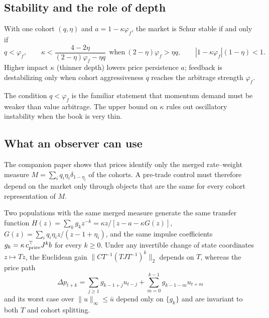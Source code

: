 \subsection{Stability and the role of depth}

\begin{proposition}\label{prop:jury}
With one cohort $(q,\eta)$ and $a=1-\kappa\varphi_f$, the market is Schur stable if and only if
\begin{equation}\label{eq:jury}
q<\varphi_f,\qquad \kappa<\frac{4-2\eta}{(2-\eta)\varphi_f-\eta q}\ \ \text{when}\ (2-\eta)\varphi_f>\eta q,\qquad |1-\kappa\varphi_f|(1-\eta)<1 .
\end{equation}
Higher impact $\kappa$ (thinner depth) lowers price persistence $a$; feedback is destabilizing only when cohort aggressiveness $q$ reaches the arbitrage strength $\varphi_f$.
\end{proposition}

The condition $q<\varphi_f$ is the familiar statement that momentum demand must be weaker than value arbitrage. The upper bound on $\kappa$ rules out oscillatory instability when the book is very thin.

\subsection{What an observer can use}

The companion paper shows that prices identify only the merged rate--weight measure $M=\sum_iq_i\eta_i\delta_{1-\eta_i}$ of the cohorts. A pre-trade control must therefore depend on the market only through objects that are the same for every cohort representation of $M$.

\begin{proposition}\label{prop:invariance}
Two populations with the same merged measure generate the same transfer function $H(z)=\sum_kg_kz^{-k}=\kappa z/[z-a-\kappa G(z)]$, $G(z)=\sum_iq_i\eta_iz/(z-1+\eta_i)$, and the same impulse coefficients $g_k=\kappa\,c_{\rm price}^\top J^kb$ for every $k\ge0$. Under any invertible change of state coordinates $z\mapsto Tz$, the Euclidean gain $\|CT^{-1}(TJT^{-1})^k\|_2$ depends on $T$, whereas the price path
\[
\Delta p_{t+k}=\sum_{j\ge1}g_{k-1+j}u_{t-j}+\sum_{m=0}^{k-1}g_{k-1-m}u_{t+m}
\]
and its worst case over $\|u\|_\infty\le\bar u$ depend only on $\{g_k\}$ and are invariant to both $T$ and cohort splitting.
\end{proposition}


